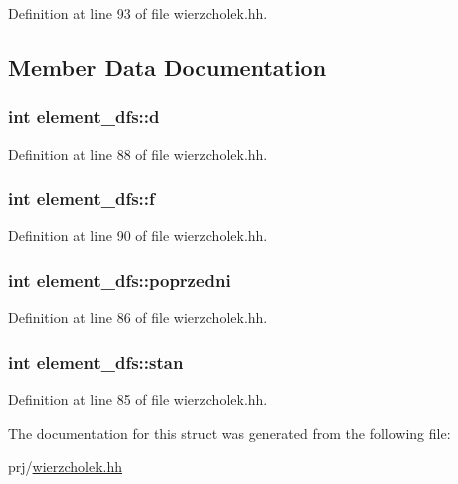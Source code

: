 \-Definition at line 93 of file wierzcholek.\-hh.



\subsection{\-Member \-Data \-Documentation}
\hypertarget{structelement__dfs_ae2d3c82805dc8b9b24a7dc1511c283dd}{
\subsubsection[{d}]{\setlength{\rightskip}{0pt plus 5cm}int {\bf element\-\_\-dfs\-::d}}}\label{structelement__dfs_ae2d3c82805dc8b9b24a7dc1511c283dd}


\-Definition at line 88 of file wierzcholek.\-hh.

\hypertarget{structelement__dfs_a9a75ad927680701485941a4e42b36290}{
\subsubsection[{f}]{\setlength{\rightskip}{0pt plus 5cm}int {\bf element\-\_\-dfs\-::f}}}\label{structelement__dfs_a9a75ad927680701485941a4e42b36290}


\-Definition at line 90 of file wierzcholek.\-hh.

\hypertarget{structelement__dfs_af3205a446fe8c834532d3b5de81deefa}{
\subsubsection[{poprzedni}]{\setlength{\rightskip}{0pt plus 5cm}int {\bf element\-\_\-dfs\-::poprzedni}}}\label{structelement__dfs_af3205a446fe8c834532d3b5de81deefa}


\-Definition at line 86 of file wierzcholek.\-hh.

\hypertarget{structelement__dfs_a48b8257c62eb0f4c52e10bf2c06fffda}{
\subsubsection[{stan}]{\setlength{\rightskip}{0pt plus 5cm}int {\bf element\-\_\-dfs\-::stan}}}\label{structelement__dfs_a48b8257c62eb0f4c52e10bf2c06fffda}


\-Definition at line 85 of file wierzcholek.\-hh.



\-The documentation for this struct was generated from the following file\-:\begin{DoxyCompactItemize}
\item 
prj/\hyperlink{wierzcholek_8hh}{wierzcholek.\-hh}\end{DoxyCompactItemize}
